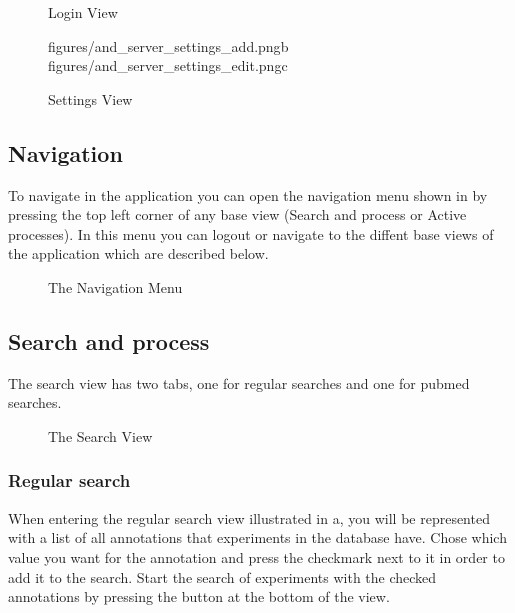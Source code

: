 \begin{figure}[h]
\caption{Login View}
\label{fig:and_login_man}
\end{figure}
\FloatBarrier

\begin{figure}[h]
		{figures/and_server_settings_add.png}{b}
		{figures/and_server_settings_edit.png}{c}
\caption{Settings View}
\label{fig:and_settings_man}
\end{figure}
\FloatBarrier

\subsection{Navigation}
To navigate in the application you can open the navigation menu shown in  by pressing the top left corner of any base view (Search and process or Active processes). In this menu you can logout or navigate to the diffent base views of the application which are described below.

\begin{figure}[h]
\caption{The Navigation Menu}
\label{fig:and_main_nav}
\end{figure}
\FloatBarrier

\subsection{Search and process}\label{sec:and_search}
The search view has two tabs, one for regular searches and one for pubmed searches.

\begin{figure}[h]
\caption{The Search View}
\label{fig:and_search_man}
\end{figure}
\FloatBarrier

\subsubsection{Regular search}
When entering the regular search view illustrated in a, you will be represented with a list of all
annotations that experiments in the database have. Chose which value you want for the annotation and press the checkmark next to it in order to add it to the search. Start the search of experiments with the checked annotations by pressing the  button at the bottom of the view.

